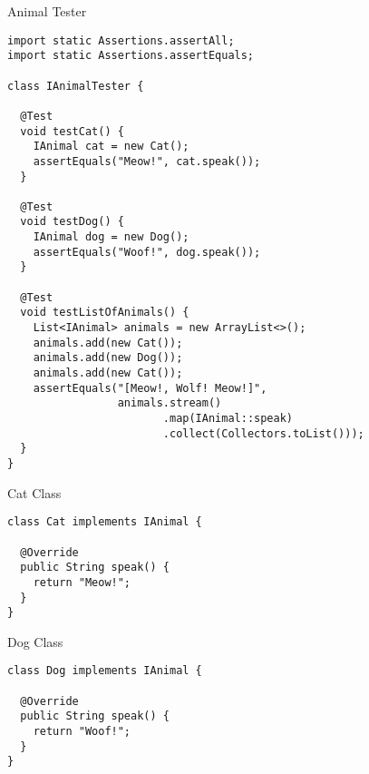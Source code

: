 \begin{cl}[]{Animal Tester}
\begin{lstlisting}[language=MyJava]
import static Assertions.assertAll;
import static Assertions.assertEquals;

class IAnimalTester {
  
  @Test
  void testCat() {
    IAnimal cat = new Cat();
    assertEquals("Meow!", cat.speak());
  }

  @Test
  void testDog() {
    IAnimal dog = new Dog();
    assertEquals("Woof!", dog.speak());
  }

  @Test
  void testListOfAnimals() {
    List<IAnimal> animals = new ArrayList<>();
    animals.add(new Cat());
    animals.add(new Dog());
    animals.add(new Cat());
    assertEquals("[Meow!, Wolf! Meow!]", 
                 animals.stream()
                        .map(IAnimal::speak)
                        .collect(Collectors.toList()));
  }
}
\end{lstlisting}
\end{cl}

\begin{cl}[]{Cat Class}
\begin{lstlisting}[language=MyJava]
class Cat implements IAnimal {

  @Override
  public String speak() {
    return "Meow!";
  }
}
\end{lstlisting}
\end{cl}

\begin{cl}[]{Dog Class}
\begin{lstlisting}[language=MyJava]
class Dog implements IAnimal {

  @Override
  public String speak() {
    return "Woof!";
  }
}
\end{lstlisting}
\end{cl}


